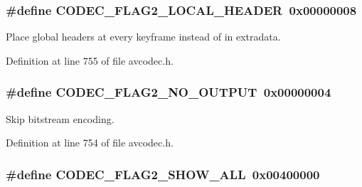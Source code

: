 \subsubsection[{\texorpdfstring{C\+O\+D\+E\+C\+\_\+\+F\+L\+A\+G2\+\_\+\+L\+O\+C\+A\+L\+\_\+\+H\+E\+A\+D\+ER}{CODEC_FLAG2_LOCAL_HEADER}}]{\setlength{\rightskip}{0pt plus 5cm}\#define C\+O\+D\+E\+C\+\_\+\+F\+L\+A\+G2\+\_\+\+L\+O\+C\+A\+L\+\_\+\+H\+E\+A\+D\+ER~0x00000008}\hypertarget{group__lavc__core_ga7c32c57a6dda25f64d1a0ee6894be164}{}\label{group__lavc__core_ga7c32c57a6dda25f64d1a0ee6894be164}


Place global headers at every keyframe instead of in extradata. 



Definition at line 755 of file avcodec.\+h.

\subsubsection[{\texorpdfstring{C\+O\+D\+E\+C\+\_\+\+F\+L\+A\+G2\+\_\+\+N\+O\+\_\+\+O\+U\+T\+P\+UT}{CODEC_FLAG2_NO_OUTPUT}}]{\setlength{\rightskip}{0pt plus 5cm}\#define C\+O\+D\+E\+C\+\_\+\+F\+L\+A\+G2\+\_\+\+N\+O\+\_\+\+O\+U\+T\+P\+UT~0x00000004}\hypertarget{group__lavc__core_ga2c728d6fdb41252eb2c17788aecd8b58}{}\label{group__lavc__core_ga2c728d6fdb41252eb2c17788aecd8b58}


Skip bitstream encoding. 



Definition at line 754 of file avcodec.\+h.

\subsubsection[{\texorpdfstring{C\+O\+D\+E\+C\+\_\+\+F\+L\+A\+G2\+\_\+\+S\+H\+O\+W\+\_\+\+A\+LL}{CODEC_FLAG2_SHOW_ALL}}]{\setlength{\rightskip}{0pt plus 5cm}\#define C\+O\+D\+E\+C\+\_\+\+F\+L\+A\+G2\+\_\+\+S\+H\+O\+W\+\_\+\+A\+LL~0x00400000}\hypertarget{group__lavc__core_ga950fb622a6f7aa04350862e3e21c67a3}{}\label{group__lavc__core_ga950fb622a6f7aa04350862e3e21c67a3}


